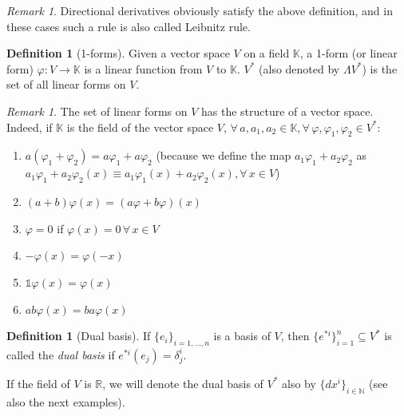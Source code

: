 \documentclass[a4paper,11pt,titlepage, article, oneside]{memoir}
\numberwithin{equation}{section}
\theoremstyle{definition}
\newtheorem{definition}[theorem]{Definition}
\theoremstyle{remark}
\newtheorem{remark}[theorem]{Remark}
\newcommand{\rfield}{\mathbb{R}}
\begin{document}
\begin{remarkbox}\begin{remark}
Directional derivatives obviously satisfy the above definition, and in these cases such a rule is also called Leibnitz rule.
\end{remark}\end{remarkbox}

\begin{definition}[1-forms]
Given a  vector space $V$ on a field $\mathbb{K}$, a 1-form (or linear form) $\varphi \colon V \rightarrow \mathbb{K}$ is a linear function from $V$ to $\mathbb{K}$. $V^*$ (also denoted by $\Lambda V^*$) is the set of all linear forms on $V$.
\end{definition}

\begin{remarkbox}\begin{remark}
  The set of linear forms on $V$ has the structure of a vector space. Indeed, if $\mathbb{K}$ is the field of the vector space $V$, $\forall\, a, a_1, a_2 \in \mathbb{K}, \forall\, \varphi, \varphi_1, \varphi_2 \in V^*$:
  \begin{enumerate}
    \item $a(\varphi_1 + \varphi_2) = a \varphi_1 + a\varphi_2$ (because we define the map $a_1\varphi_1 + a_2\varphi_2$ as $a_1\varphi_1 + a_2\varphi_2 (x) \equiv a_1 \varphi_1(x) + a_2 \varphi_2(x), \forall\, x \in V$)
    \item $(a+b)\varphi(x) = (a\varphi + b \varphi)(x)$
    \item $\varphi=0$ if $\varphi(x) = 0 \, \forall\, x \in V$
    \item $-\varphi(x) = \varphi(-x)$
    \item $\mathbb{1}\varphi(x) = \varphi(x)$
    \item $ab\varphi(x) = ba \varphi(x)$
  \end{enumerate}
\end{remark}\end{remarkbox}

\begin{definition}[Dual basis]
If $\{e_i\}_{i=1, \ldots, n}$ is a basis of $V$, then $\{ e^{*i} \}_{i=1}^n \subseteq V^*$ is called the \textit{dual basis} if $e^{*i}(e_j) = \delta^i_j$.
\end{definition}

If the field of $V$ is $\rfield$, we will denote the dual basis of $V^*$ also by $\{dx^i\}_{i \in \mathbb{N}}$ (see also the next examples).
\end{document}
